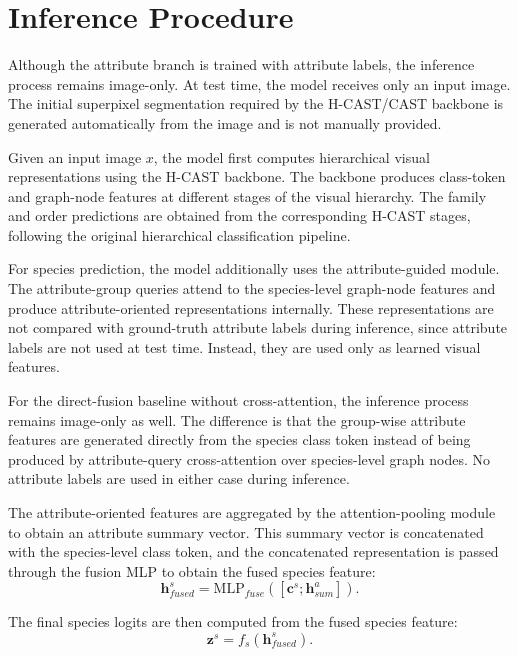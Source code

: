 \section{Inference Procedure}

Although the attribute branch is trained with attribute labels, the inference process remains image-only. At test time, the model receives only an input image. The initial superpixel segmentation required by the H-CAST/CAST backbone \cite{ke2024learning, park2025visually} is generated automatically from the image and is not manually provided.

Given an input image \(x\), the model first computes hierarchical visual representations using the H-CAST backbone. The backbone produces class-token and graph-node features at different stages of the visual hierarchy. The family and order predictions are obtained from the corresponding H-CAST stages, following the original hierarchical classification pipeline.

For species prediction, the model additionally uses the attribute-guided module. The attribute-group queries attend to the species-level graph-node features and produce attribute-oriented representations internally. These representations are not compared with ground-truth attribute labels during inference, since attribute labels are not used at test time. Instead, they are used only as learned visual features.

For the direct-fusion baseline without cross-attention, the inference process remains image-only as well. The difference is that the group-wise attribute features are generated directly from the species class token instead of being produced by attribute-query cross-attention over species-level graph nodes. No attribute labels are used in either case during inference.

The attribute-oriented features are aggregated by the attention-pooling module to obtain an attribute summary vector. This summary vector is concatenated with the species-level class token, and the concatenated representation is passed through the fusion MLP to obtain the fused species feature:
\begin{equation}
    \mathbf{h}^{s}_{fused}
    =
    \mathrm{MLP}_{fuse}
    \left(
        [\mathbf{c}^{s}; \mathbf{h}^{a}_{sum}]
    \right).
\end{equation}

The final species logits are then computed from the fused species feature:
\begin{equation}
    \mathbf{z}^{s}
    =
    f_s(\mathbf{h}^{s}_{fused}).
\end{equation}

